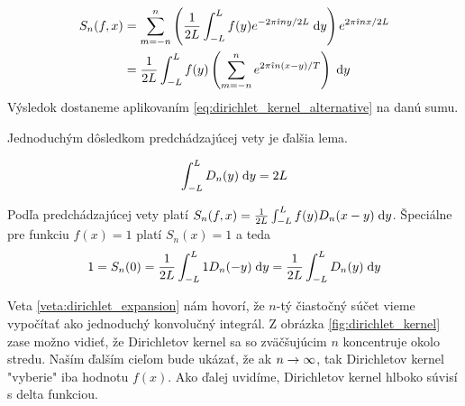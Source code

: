 \begin{dokaz}
    \begin{equation*}
    \begin{split}
        S_n(f,x) &= \sum_{m=-n}^{n} \left(
            \frac{1}{2L} \int_{-L}^{L} f(y) e^{-2\pi\hat{\imath} n y/2L} \; \mathrm{d} y
            \right) 
                e^{2\pi\hat{\imath} n x/2L} \\
            &= \frac{1}{2L} \int_{-L}^{L} f(y) \left(
                    \sum_{m=-n}^{n} e^{2\pi\hat{\imath} n (x-y)/T}
                \right) \; \mathrm{d} y \\
    \end{split}
    \end{equation*}
    Výsledok dostaneme aplikovaním
    \eqref{eq:dirichlet_kernel_alternative} na danú sumu.
\end{dokaz}

Jednoduchým dôsledkom predchádzajúcej vety je ďalšia lema.
\begin{lema}
    \begin{equation*}
        \int_{-L}^{L} D_n(y) \; \mathrm{d} y = 2L
    \end{equation*}
\end{lema}
\begin{dokaz}
    Podľa predchádzajúcej vety platí 
    $S_n(f,x) = \frac{1}{2L} \int_{-L}^{L} f(y) D_n(x-y) \; \mathrm{d} y$.
    Špeciálne pre funkciu $f(x)=1$ platí $S_n(x)=1$ a teda
    \begin{equation*}
        1=S_n(0) = \frac{1}{2L} \int_{-L}^{L} 1 D_n(-y) \; \mathrm{d} y =
            \frac{1}{2L} \int_{-L}^{L} D_n(y) \; \mathrm{d} y
    \end{equation*}
    \label{lema:dirichlet_kernel_integration}
\end{dokaz}

Veta \ref{veta:dirichlet_expansion} nám hovorí, že $n$-tý čiastočný
súčet vieme vypočítať ako jednoduchý konvolučný
 integrál.
Z obrázka \ref{fig:dirichlet_kernel} zase možno vidieť, že
Dirichletov kernel sa so zväčšujúcim $n$ koncentruje okolo stredu.
Naším ďalším cieľom bude ukázať, že ak $n\rightarrow \infty$, tak
Dirichletov kernel "vyberie" iba hodnotu $f(x)$.
Ako ďalej uvidíme, Dirichletov kernel hlboko súvisí s 
delta funkciou.
